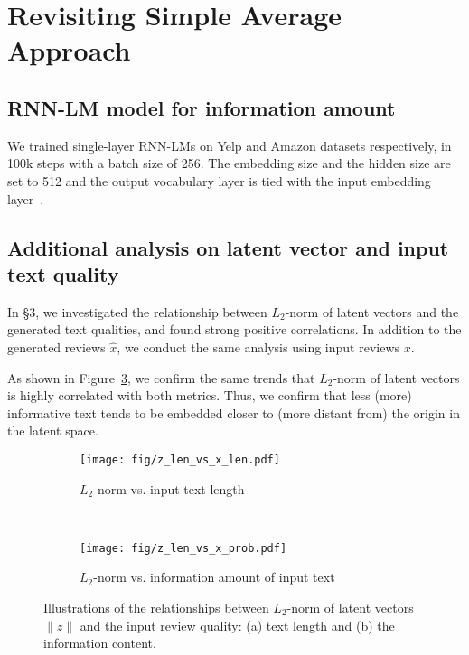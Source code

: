 \documentclass[11pt]{article}
\begin{document}
\section{Revisiting Simple Average Approach}

\subsection{RNN-LM model for information amount}
\label{app:rnnlm}
We trained single-layer RNN-LMs on Yelp and Amazon datasets respectively, in 100k steps with a batch size of 256.
The embedding size and the hidden size are set to 512 and the output vocabulary layer is tied with the input embedding layer~\cite{press-wolf-2017-using,inan2017tying}.

\subsection{Additional analysis on latent vector and input text quality}
\label{app:z_analysis}
In \S 3, we investigated the relationship between $L_2$-norm of latent vectors and the generated text qualities, and found strong positive correlations.
In addition to the generated reviews $\hat{x}$, we conduct the same analysis using input reviews $x$.

As shown in Figure~\ref{fig:z_analysis_app}, we confirm the same trends that $L_2$-norm of latent vectors is highly correlated with both metrics. Thus, we confirm that less (more) informative text tends to be embedded closer to (more distant from) the origin in the latent space.

\begin{figure}[th]
    \centering
    \begin{subfigure}[b]{0.99\linewidth}
        \centering
        \texttt{[image: fig/z\_len\_vs\_x\_len.pdf]}
        \caption{$L_2$-norm vs. input text length}
        \label{fig:z_x_app}
    \end{subfigure}
    ~\hfill
    \begin{subfigure}[b]{0.99\linewidth}
        \centering
        \texttt{[image: fig/z\_len\_vs\_x\_prob.pdf]}
        \caption{$L_2$-norm vs. information amount of input text}
        \label{fig:z_prob_app}
    \end{subfigure}
    \caption{Illustrations of the relationships between $L_2$-norm of latent vectors $\|z\|$ and the input review quality: (a) text length and (b) the information content.}
    \label{fig:z_analysis_app}
\end{figure}
\end{document}

